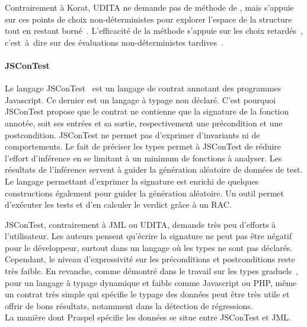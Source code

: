 Contrairement à Korat, UDITA ne demande pas de méthode de
, mais s'appuie sur ces points de choix
non-déterministes pour explorer l'espace de la structure tout en restant
borné~. L'efficacité de la méthode s'appuie
sur les choix retardés~, c'est~à~dire sur des évaluations
non-déterministes tardives~.

\paragraph{JSConTest} Le langage JSConTest~ est un langage
de contrat annotant des programmes Javascript. Ce dernier est un langage à typage
non déclaré. C'est pourquoi JSConTest propose que le contrat ne contienne que
la signature de la fonction annotée, soit ses entrées et sa sortie,
respectivement une précondition et une postcondition. JSConTest ne permet pas
d'exprimer d'invariants ni de comportements. Le fait de préciser les types
permet à JSConTest de réduire l'effort d'inférence en se limitant à un minimum
de fonctions à analyser. Les résultats de l'inférence servent à guider la
génération aléatoire de données de test. Le langage permettant d'exprimer la
signature est enrichi de quelques constructions également pour guider la
génération aléatoire. Un outil permet d'exécuter les tests et d'en calculer le
verdict grâce à un RAC.

JSConTest, contrairement à JML ou UDITA, demande très peu d'efforts à
l'utilisateur. Les auteurs pensent qu'écrire la signature ne peut pas être
négatif pour le développeur, surtout dans un langage où les types ne sont pas
déclarés. Cependant, le niveau d'expressivité sur les préconditions et
postconditions reste très faible. En revanche, comme démontré dans le travail
sur les types graduels~, pour un langage à typage dynamique et
faible comme Javascript ou PHP, même un contrat très simple qui spécifie le
typage des données peut être très utile et offrir de bons résultats, notamment
dans la détection de régressions. \\

La manière dont Praspel spécifie les données se situe entre JSConTest et JML.

